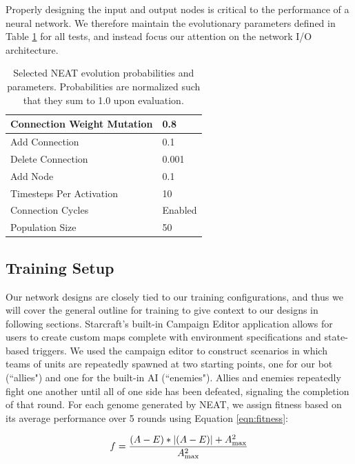 \documentclass[10pt,a4paper,twocolumn]{article}
\begin{document}
Properly designing the input and output nodes is critical to the performance of a neural network. We therefore maintain the evolutionary parameters defined in Table \ref{tab:neat_params_specific} for all tests, and instead focus our attention on the network I/O architecture.

\begin{table}
\centering
\begin{tabular}{|l|l|}
	\hline
	Connection Weight Mutation & 0.8\\ \hline
	Add Connection & 0.1\\ \hline
	Delete Connection & 0.001\\ \hline
	Add Node & 0.1\\ \hline
	Timesteps Per Activation & 10\\ \hline
	Connection Cycles & Enabled \\ \hline
	Population Size & 50 \\ \hline
\end{tabular}
\caption{Selected NEAT evolution probabilities and parameters. Probabilities are normalized such that they sum to 1.0 upon evaluation.}
\label{tab:neat_params_specific}
\end{table}

\subsection{Training Setup}

Our network designs are closely tied to our training configurations, and thus we will cover the general outline for training to give context to our designs in following sections. Starcraft's built-in Campaign Editor application allows for users to create custom maps complete with environment specifications and state-based triggers. We used the campaign editor to construct scenarios in which teams of units are repeatedly spawned at two starting points, one for our bot (``allies") and one for the built-in AI (``enemies"). Allies and enemies repeatedly fight one another until all of one side has been defeated, signaling the completion of that round. For each genome generated by NEAT, we assign fitness based on its average performance over 5 rounds using Equation \ref{eqn:fitness}:

\begin{equation}
f = \frac{(A - E) * |(A - E)| + A_\mathrm{max}^2}{A_\mathrm{max}^2}\\
\label{eqn:fitness}
\end{equation}
\end{document}
